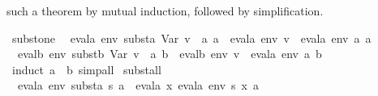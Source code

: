 \begin{isabellebody}
\begin{isamarkuptext}
  such a theorem by mutual induction, followed by simplification.%
\end{isamarkuptext}%
\isamarkuptrue%
\isamarkupfalse%
\ subst{}one{}\isanewline
\ \ {}evala\ env\ {}substa\ {}Var\ {}v\ {}{}\ a{}{}{}\ a{}\ {}\ evala\ {}env\ {}v\ {}{}\ evala\ env\ a{}{}{}\ a{}\isanewline
\ \ {}evalb\ env\ {}substb\ {}Var\ {}v\ {}{}\ a{}{}{}\ b{}\ {}\ evalb\ {}env\ {}v\ {}{}\ evala\ env\ a{}{}{}\ b{}\isanewline
%
\isadelimproof
\ \ %
\endisadelimproof
%
\isatagproof
{}\isamarkupfalse%
\ {}induct\ a\ \ b{}\ simp{}all%
\endisatagproof
{\isafoldproof}%
%
\isadelimproof
\isanewline
%
\endisadelimproof
\isanewline
{}\isamarkupfalse%
\ subst{}all{}\isanewline
\ \ {}evala\ env\ {}substa\ s\ a{}\ {}\ evala\ {}{}x{}\ evala\ env\ {}s\ x{}{}\ a{}\isanewline

\end{isabellebody}
